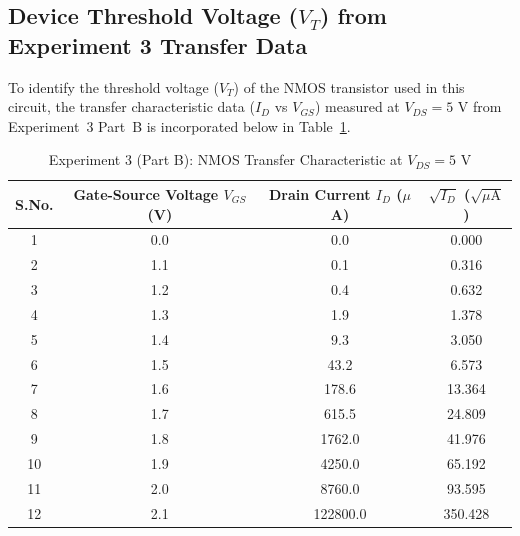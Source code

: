 \documentclass[11pt,a4paper]{article}
\begin{document}
\clearpage 

\subsection{Device Threshold Voltage (\texorpdfstring{$V_T$}{VT}) from Experiment 3 Transfer Data}
To identify the threshold voltage ($V_T$) of the NMOS transistor used in this circuit, the transfer characteristic data ($I_D$ vs $V_{GS}$) measured at $V_{DS} = 5\text{ V}$ from Experiment~3 Part~B is incorporated below in Table~\ref{tab:exp3_transfer}.

\begin{table}[H]
\centering
\caption{Experiment 3 (Part B): NMOS Transfer Characteristic at $V_{DS} = 5\text{ V}$}\label{tab:exp3_transfer}
\begin{tabular}{cccc}
\toprule
\textbf{S.No.} & \textbf{Gate-Source Voltage $V_{GS}$ (V)} & \textbf{Drain Current $I_D$ ($\mu$A)} & \textbf{$\sqrt{I_D}$ ($\sqrt{\mu\text{A}}$)} \\
\midrule
1  & 0.0 & 0.0    & 0.000 \\
2  & 1.1 & 0.1    & 0.316 \\
3  & 1.2 & 0.4    & 0.632 \\
4  & 1.3 & 1.9    & 1.378 \\
5  & 1.4 & 9.3    & 3.050 \\
6  & 1.5 & 43.2   & 6.573 \\
7  & 1.6 & 178.6  & 13.364 \\
8  & 1.7 & 615.5  & 24.809 \\
9  & 1.8 & 1762.0 & 41.976 \\
10 & 1.9 & 4250.0 & 65.192 \\
11 & 2.0 & 8760.0 & 93.595 \\
12 & 2.1 & 122800.0 & 350.428 \\
\bottomrule
\end{tabular}
\end{table}
\end{document}
